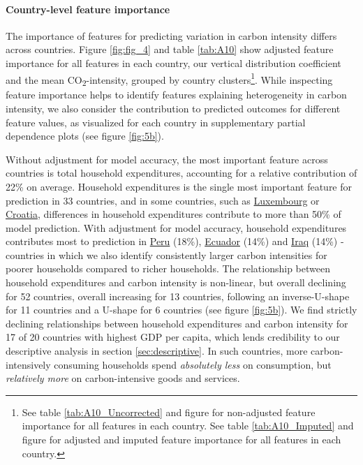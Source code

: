 \documentclass[12pt, a4paper]{article}
\begin{document}
\paragraph{Country-level feature importance}
The importance of features for predicting variation in carbon intensity differs across countries. Figure \ref{fig:fig_4} and table \ref{tab:A10} show adjusted feature importance for all features in each country, our vertical distribution coefficient and the mean CO\textsubscript{2}-intensity, grouped by country clusters\footnote{See table \ref{tab:A10_Uncorrected} and figure  for non-adjusted feature importance for all features in each country. See table \ref{tab:A10_Imputed} and figure  for adjusted and imputed feature importance for all features in each country.}. While inspecting feature importance helps to identify features explaining heterogeneity in carbon intensity, we also consider the contribution to predicted outcomes for different feature values, as visualized for each country in supplementary partial dependence plots (see figure \ref{fig:5b}).

Without adjustment for model accuracy, the most important feature across countries is total household expenditures, accounting for a relative contribution of 22\% on average. Household expenditures is the single most important feature for prediction in 33 countries, and in some countries, such as \hyperref[fig:5b_LUX]{Luxembourg} or \hyperref[fig:5b_HRV]{Croatia}, differences in household expenditures contribute to more than 50\% of model prediction. With adjustment for model accuracy, household expenditures contributes most to prediction in \hyperref[fig:5b_PER]{Peru} (18\%), \hyperref[fig:5b_ECU]{Ecuador} (14\%) and \hyperref[fig:5b_IRQ]{Iraq} (14\%) - countries in which we also identify consistently larger carbon intensities for poorer households compared to richer households. The relationship between household expenditures and carbon intensity is non-linear, but overall declining for 52 countries, overall increasing for 13 countries, following an inverse-U-shape for 11 countries and a U-shape for 6 countries (see figure \ref{fig:5b}). We find strictly declining relationships between household expenditures and carbon intensity for 17 of 20 countries with highest GDP per capita, which lends credibility to our descriptive analysis in section \ref{sec:descriptive}. In such countries, more carbon-intensively consuming households spend \textit{absolutely less} on consumption, but \textit{relatively more} on carbon-intensive goods and services.
\end{document}
